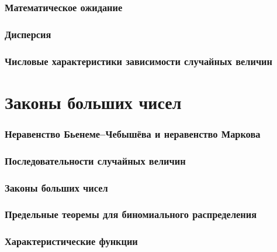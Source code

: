 \documentclass[a4paper,14pt]{extarticle}
\begin{document}
\section{Математическое ожидание} 
\label{par:17}

\section{Дисперсия} 
\label{par:18}

\section{Числовые характеристики зависимости
случайных величин} 
\label{par:19}

\part{Законы больших чисел}

\section{Неравенство Бьенеме–Чебышёва и
неравенство Маркова}
\label{par:20}

\section{Последовательности случайных величин}
\label{par:21}


\section{Законы больших чисел} 
\label{par:22}

\section{Предельные теоремы для
биномиального распределения} 
\label{par:23}

\section{Характеристические функции}
\label{par:24}
\end{document}
